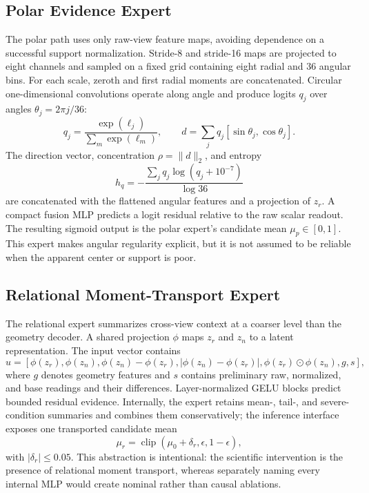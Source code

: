 \documentclass[electronics,article,submit,oneauthor]{Definitions/mdpi}
\begin{document}
\subsection{Polar Evidence Expert}
\label{subsec:polar}

The polar path uses only raw-view feature maps, avoiding dependence on a successful support normalization. Stride-8 and stride-16 maps are projected to eight channels and sampled on a fixed grid containing eight radial and 36 angular bins. For each scale, zeroth and first radial moments are concatenated. Circular one-dimensional convolutions operate along angle and produce logits $q_j$ over angles $\theta_j=2\pi j/36$:
\begin{equation}
q_j=\frac{\exp(\ell_j)}{\sum_m\exp(\ell_m)},\qquad
d=\sum_j q_j[\sin\theta_j,\cos\theta_j].
\label{eq:polar_direction}
\end{equation}
The direction vector, concentration $\rho=\lVert d\rVert_2$, and entropy
\begin{equation}
h_q=-\frac{\sum_j q_j\log(q_j+10^{-7})}{\log 36}
\label{eq:polar_entropy}
\end{equation}
are concatenated with the flattened angular features and a projection of $z_r$. A compact fusion MLP predicts a logit residual relative to the raw scalar readout. The resulting sigmoid output is the polar expert's candidate mean $\mu_p\in[0,1]$. This expert makes angular regularity explicit, but it is not assumed to be reliable when the apparent center or support is poor.

\subsection{Relational Moment-Transport Expert}
\label{subsec:relational}

The relational expert summarizes cross-view context at a coarser level than the geometry decoder. A shared projection $\phi$ maps $z_r$ and $z_n$ to a latent representation. The input vector contains
\begin{equation}
u=\left[\phi(z_r),\phi(z_n),\phi(z_n)-\phi(z_r),
|\phi(z_n)-\phi(z_r)|,\phi(z_r)\odot\phi(z_n),g,s\right],
\label{eq:relational_features}
\end{equation}
where $g$ denotes geometry features and $s$ contains preliminary raw, normalized, and base readings and their differences. Layer-normalized GELU blocks predict bounded residual evidence. Internally, the expert retains mean-, tail-, and severe-condition summaries and combines them conservatively; the inference interface exposes one transported candidate mean
\begin{equation}
\mu_r=\operatorname{clip}(\mu_0+\delta_r,\epsilon,1-\epsilon),
\label{eq:relational_candidate}
\end{equation}
with $|\delta_r|\leq0.05$. This abstraction is intentional: the scientific intervention is the presence of relational moment transport, whereas separately naming every internal MLP would create nominal rather than causal ablations.
\end{document}
